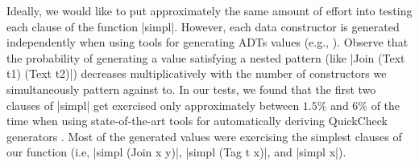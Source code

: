  Ideally, we would like to put approximately the same amount of effort into
 testing each clause of the function |simpl|.
%
 However, each data constructor is generated independently when using tools for
 generating ADTs values (e.g., \tocite).
 Observe that the probability of generating a value satisfying a nested pattern
 (like |Join (Text t1) (Text t2)|) decreases multiplicatively with the number of
 constructors we simultaneously pattern against to.
%
 In our tests, we found that the first two clauses of |simpl| get exercised only
 approximately between $1.5\%$ and $6\%$ of the time when using state-of-the-art
 tools for automatically deriving QuickCheck generators
 \cite{GriecoCB16,DBLP:conf/haskell/MistaRH18}.
%
 Most of the generated values were exercising the simplest clauses of our
 function (i.e, |simpl (Join x y)|, |simpl (Tag t x)|, and |simpl x|).






